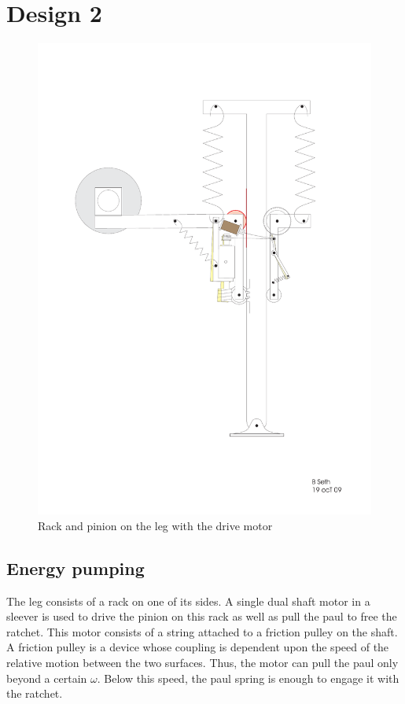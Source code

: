 \section{Design 2}
\begin{figure}[!h]
\centering
\includegraphics[scale=0.5]{fig/seth_design.pdf}
\caption{Rack and pinion on the leg with the drive motor}
\label{fig:3_seth_design}
\end{figure}

\subsection{Energy pumping}
The leg consists of a rack on one of its sides. A single dual shaft motor in a sleever is used to drive the pinion
on this rack as
well as pull the paul to free the ratchet. This motor consists of a string attached to a friction pulley on the shaft.
A friction pulley is a device whose coupling is dependent upon the speed of the relative motion between the two surfaces.
Thus, the motor can pull the paul only beyond a certain $\omega$. Below this speed, the paul spring is enough to
engage it with the ratchet.

